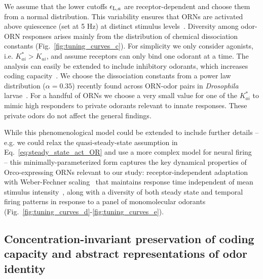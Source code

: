 \documentclass[9pt,twocolumn,twoside]{pnas-new}
\begin{document}
We assume that the lower cutoffs $\epsilon_{\textup{L}, a}$ are receptor-dependent and choose them from a normal distribution. This variability ensures that ORNs are activated above quiescence (set at 5 Hz) at distinct stimulus levels~\cite{srinivas_elife, martelli}. Diversity among odor-ORN responses arises mainly from the distribution of chemical dissociation constants (Fig.~\ref{fig:tuning_curves_c}). For simplicity we only consider agonists, i.e. $K^*_{ai}>K_{ai}$, and assume receptors can only bind one odorant at a time. The analysis can easily be extended to include inhibitory odorants, which increases coding capacity~\cite{Cao_Tu_WL}. We choose the dissociation constants from a power law distribution ($\alpha = 0.35$) recently found across ORN-odor pairs in \textit{Drosophila} larvae~\cite{si2017invariances}. For a handful of ORNs we choose a very small value for one of the $K^*_{ai}$ to mimic high responders to private odorants relevant to innate responses. These private odors do not affect the general findings. 
 
While this phenomenological model could be extended to include further details -- e.g. we could relax the quasi-steady-state assumption in Eq.~\ref{eq:steady_state_act_OR} and use a more complex model for neural firing~\cite{srinivas_elife} -- this minimally-parameterized form captures the key dynamical properties of Orco-expressing ORNs relevant to our study: receptor-independent adaptation~\cite{nagel_wilson_biophysical} with Weber-Fechner scaling~\cite{srinivas_elife,cafaro_WL,cao_WL} that maintains response time independent of mean stimulus intensity~\cite{martelli,srinivas_elife}, along with a diversity of both steady state and temporal firing patterns in response to a panel of monomolecular odorants~\cite{hallem_carlson,montague2011similar,stopfer_nat_neuro,stopfer_temporal_channel,stopfer_temporal_model} (Fig.~\ref{fig:tuning_curves_d}-\ref{fig:tuning_curves_e}). 








\subsection*{Concentration-invariant preservation of coding capacity and abstract representations of odor identity}
\end{document}
